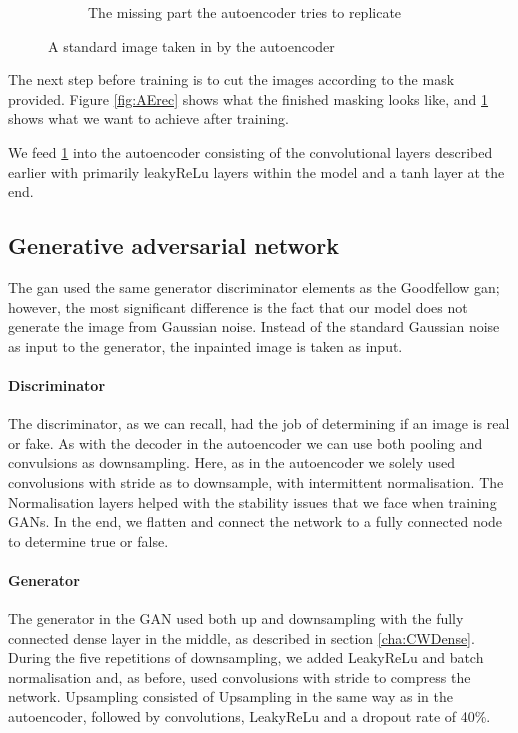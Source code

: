 \begin{figure}[]
\begin{subfigure}[b]{0.49\textwidth}
    \caption[Hate to be this guy]%
    {{\small The missing part the autoencoder tries to replicate}}    
    \label{fig:AErep}
\end{subfigure}
\caption{A standard image taken in by the autoencoder} 
\label{fig:AEmasks}
\end{figure}

The next step before training is to cut the images according to the mask provided. Figure \ref{fig:AErec} shows what the finished masking looks like, and \ref{fig:AErep} shows what we want to achieve after training.

We feed \ref{fig:AErep} into the autoencoder consisting of the convolutional layers described earlier with primarily leakyReLu layers within the model and a tanh layer at the end.



\subsection{Generative adversarial network}
The gan used the same generator discriminator elements as the Goodfellow gan; however, the most significant difference is the fact that our model does not generate the image from Gaussian noise.
Instead of the standard Gaussian noise as input to the generator, the inpainted image is taken as input. 

\paragraph{Discriminator}
The discriminator, as we can recall, had the job of determining if an image is real or fake. As with the decoder in the autoencoder we can use both pooling and convulsions as downsampling. Here, as in the autoencoder we solely used convolusions with stride as to downsample, with intermittent normalisation. The Normalisation layers helped with the stability issues that we face when training GANs. In the end, we flatten and connect the network to a fully connected node to determine true or false.

\paragraph{Generator}
The generator in the GAN used both up and downsampling with the fully connected dense layer in the middle, as described in section \ref{cha:CWDense}.  
During the five repetitions of downsampling, we added LeakyReLu and batch normalisation and, as before, used convolusions with stride to compress the network.
Upsampling consisted of Upsampling in the same way as in the autoencoder, followed by convolutions, LeakyReLu and a dropout rate of 40\%. 



